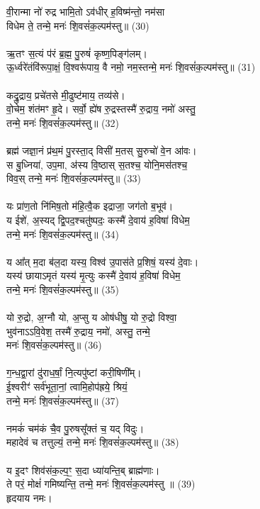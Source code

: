 {वी॒रान्मा नो॑ रुद्र भामि॒तो ऽव॑धीर् ह॒विष्म॑न्तो॒ नम॑सा \\
विधेम ते॒ तन्मे॒ मनः॑ शि॒वसं॑क॒ल्पम॑स्तु॥ (30)\\
\\
ऋ॒तꣳ स॒त्यं प॑रं ब्र॒ह्म॒ पु॒रुषं॑ कृष्ण॒पिङ्ग॑लम्। \\
ऊ॒र्ध्वरे॑तंवि॑रूपा॒क्षं॒ वि॒श्वरू॑पाय॒ वै नमो॒ नम॒स्तन्मे॒ मनः॑ शि॒वसं॑क॒ल्पम॑स्तु॥ (31)\\
\\
कद्रु॒द्राय॒ प्रचे॑तसे मी॒ढुष्ट॑माय॒ तव्य॑से। \\
वो॒चेम॒ शंत॑मꣳ हृ॒दे। सर्वो॒ ह्ये॑ष रु॒द्रस्तस्मै॑ रु॒द्राय॒ नमो॑ अस्तु॒ \\
तन्मे॒ मनः॑ शि॒वसं॑क॒ल्पम॑स्तु॥ (32)\\
\\
ब्रह्म॑ जज्ञा॒नं प्र॑थ॒मं पु॒रस्ता॒द् विसी॑ म॒तस् सु॒रुचो॑ वे॒न आ॑वः। \\
स बु॒ध्निया॑, उप॒मा, अ॑स्य वि॒ष्ठास् स॒तश्च॒ योनि॒मस॑तश्च॒ \\
विव॒स् तन्मे॒ मनः॑ शि॒वसं॑क॒ल्पम॑स्तु॥ (33)\\
\\
यः प्रा॑ण॒तो नि॑मिष॒तो म॑हि॒त्वै॒क इद्राजा॒ जग॑तो ब॒भूव॑।\\
य ईशे॑, अ॒स्यद् द्वि॒पद॒श्चतु॑ष्पदः॒ कस्मै॑ दे॒वाय॑ ह॒विषा॑ विधेम॒ \\
तन्मे॒ मनः॑ शि॒वसं॑क॒ल्पम॑स्तु॥ (34)\\
\\
य आ᳚त् म॒दा ब॑ल॒दा यस्य॒ विश्व॑ उ॒पास॑ते प्र॒शिषं॒ यस्य॑ दे॒वाः। \\
यस्य॑ छायाऽमृतं यस्य॑ मृ॒त्युः कस्मै॑ दे॒वाय॑ ह॒विषा॑ विधेम॒ \\
तन्मे॒ मनः॑ शि॒वसं॑क॒ल्पम॑स्तु॥ (35)\\
\\
यो रु॒द्रो, अ॒ग्नौ यो, अ॒प्सु य ओष॑धीषु॒ यो रु॒द्रो विश्वा॒ \\
भुव॑नाऽऽवि॒वेश॒ तस्मै॑ रु॒द्राय॒ नमो॑, अस्तु॒ तन्मे॒ \\
मनः॑ शि॒वसं॑क॒ल्पम॑स्तु॥ (36)\\
\\
ग॒न्ध॒द्वा॒रां दु॑राध॒र्षां॒ नि॒त्यपु॑ष्टां करी॒षिणी᳚म्। \\
ई॒श्वरीꣳ॑ सर्व॑भूता॒नां॒ त्वामि॒होप॑ह्रये॒ श्रियं॒  \\
तन्मे॒ मनः॑ शि॒वसं॑क॒ल्पम॑स्तु॥ (37)\\
\\
नमकं॑ चम॑कं चै॒व पु॒रुषसू᳚क्तं च॒ यद् विदुः। \\
महादेवं च तत्तुल्यं॒ तन्मे॒ मनः॑ शि॒वसं॑क॒ल्पम॑स्तु॥ (38)\\
\\
य इ॒दꣳ शिव॑संक॒ल्प॒ꣳ॒ स॒दा ध्या॑यन्ति॒ब् ब्राह्म॑णाः। \\
ते परं॒ मोक्षं॑ गमिष्यन्ति॒ तन्मे॒ मनः॑ शि॒वसं॑क॒ल्पम॑स्तु ॥ (39)\\
हृदयाय नमः।\\
}
